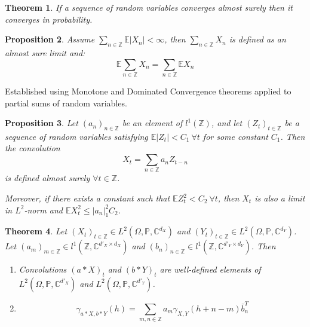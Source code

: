 \documentclass[12pt]{article}
\newtheorem{theorem}{Theorem}[section]
\newtheorem{proposition}[theorem]{Proposition}
\theoremstyle{definition}
\theoremstyle{remark}
\numberwithin{equation}{section}
\newcommand{\PP}{\mathbb{P}}
\newcommand{\ZZ}{\mathbb{Z}}
\newcommand{\CC}{\mathbb{C}}
\newcommand{\EE}{\mathbb{E}}
\begin{document}
\begin{theorem}
	If a sequence of random variables converges almost surely then it converges in probability.
\end{theorem}

\begin{proposition}
	Assume $\sum_{n\in\ZZ}\EE|X_n| < \infty$, then $\sum_{n\in\ZZ}X_n$ is defined as an almost sure limit and:
	\begin{equation*}
		\EE\sum_{n\in\ZZ}X_n = \sum_{n\in\ZZ}\EE X_n
	\end{equation*}
\end{proposition}
\proof Established using Monotone and Dominated Convergence theorems applied to partial sums of random variables.

\begin{proposition}
	Let $(a_n)_{n\in\ZZ}$ be an element of $l^1(\ZZ)$, and let $(Z_t)_{t\in\ZZ}$ be a sequence of random variables satisfying $\EE |Z_t| < C_1\ \forall t$ for some constant $C_1$. Then the convolution
	\begin{equation*}
		X_t = \sum_{n\in\ZZ}a_nZ_{t-n}
	\end{equation*}
	is defined almost surely $\forall t\in \ZZ$.

	Moreover, if there exists a constant such that $\EE Z_t^2 < C_2\ \forall t$, then $X_t$ is also a limit in $L^2$-norm and $\EE X_t^2\leq |a_n|_1^2C_2$.
\end{proposition}

\begin{theorem}
	Let $(X_t)_{t\in \ZZ}\in L^2\left(\Omega, \PP, \CC^{d_X}\right)$ and $(Y_t)_{t\in \ZZ}\in L^2\left(\Omega, \PP, \CC^{d_Y}\right)$. Let $(a_m)_{m\in\ZZ} \in l^1(\ZZ, \CC^{d'_X\times d_X})$ and $(b_n)_{n\in\ZZ} \in l^1(\ZZ, \CC^{d'_Y\times d_Y})$. Then
	\begin{enumerate}
		\item Convolutions $\left(a*X\right)_t$ and $\left(b*Y\right)_t$ are well-defined elements of $L^2\left(\Omega, \PP, \CC^{d'_X}\right)$ and $L^2\left(\Omega, \PP, \CC^{d'_Y}\right)$.
		\item \begin{equation*}
			\gamma_{a*X,b*Y}(h) = \sum_{m,n\in\ZZ}a_m\gamma_{X,Y}(h+n-m)\bar{b}_n^T %
		\end{equation*}
	\end{enumerate}
\end{theorem}
\end{document}
